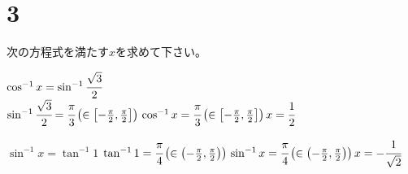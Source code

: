 \documentclass[fleqn]{jsarticle}
\begin{document}
    \section*{3}
    次の方程式を満たす$x$を求めて下さい。

    \begin{description}
		\setlength{\itemsep}{0.5cm}

            \item[(1)]
                $ \cos^{-1}{x} = \sin^{-1}{\cfrac{\sqrt{3}}{2}} $ \\
                $ \sin^{-1}{\cfrac{\sqrt{3}}{2}} = \cfrac{\pi}{3}\left(\in\left[-\frac{\pi}{2}, \frac{\pi}{2}\right]\right) \\
                \cos^{-1}{x} = \cfrac{\pi}{3}\left(\in\left[-\frac{\pi}{2}, \frac{\pi}{2}\right]\right) \\
                x = \cfrac{1}{2} $

            \item[(2)]
                $ \sin^{-1}{x} = \tan^{-1}{1} $
                $ \tan^{-1}{1} = \cfrac{\pi}{4}\left(\in\left(-\frac{\pi}{2}, \frac{\pi}{2}\right)\right) \\
                \sin^{-1}{x} = \cfrac{\pi}{4}\left(\in\left(-\frac{\pi}{2}, \frac{\pi}{2}\right)\right) \\
                x = -\cfrac{1}{\sqrt{2}} $

    \end{description}
\end{document}
